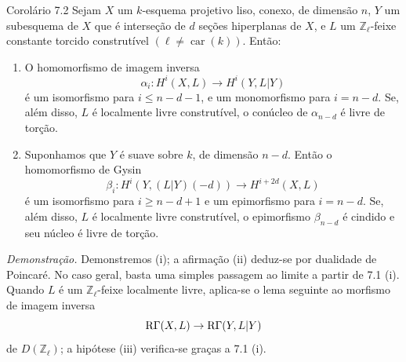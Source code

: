 \begin{statement}{Corolário 7.2}
Sejam $X$ um $k$-esquema projetivo liso, conexo, de dimensão $n$, $Y$ um subesquema de $X$ que é interseção de $d$ seções hiperplanas de $X$, e $L$ um $\mathbb Z_\ell$-feixe constante torcido construtível $(\ell\ne\operatorname{car}(k))$. Então:
\begin{enumerate}[label=(\roman*)]
\item O homomorfismo de imagem inversa
\[
\alpha_i:H^i(X,L)\to H^i(Y,L|Y)
\]
é um isomorfismo para $i\le n-d-1$, e um monomorfismo para $i=n-d$. Se, além disso, $L$ é localmente livre construtível, o conúcleo de $\alpha_{n-d}$ é livre de torção.
\item Suponhamos que $Y$ é suave sobre $k$, de dimensão $n-d$. Então o homomorfismo de Gysin
\[
\beta_i:H^i(Y,(L|Y)(-d))\to H^{i+2d}(X,L)
\]
é um isomorfismo para $i\ge n-d+1$ e um epimorfismo para $i=n-d$. Se, além disso, $L$ é localmente livre construtível, o epimorfismo $\beta_{n-d}$ é cindido e seu núcleo é livre de torção.
\end{enumerate}
\end{statement}

\emph{Demonstração.} Demonstremos (i); a afirmação (ii) deduz-se por dualidade de Poincaré. No caso geral, basta uma simples passagem ao limite a partir de 7.1 (i). Quando $L$ é um $\mathbb Z_\ell$-feixe localmente livre, aplica-se o lema seguinte ao morfismo de imagem inversa
\[
\mathrm{R}\Gamma(X,L)\to \mathrm{R}\Gamma(Y,L|Y)
\]
de $D(\mathbb Z_\ell)$; a hipótese (iii) verifica-se graças a 7.1 (i).

